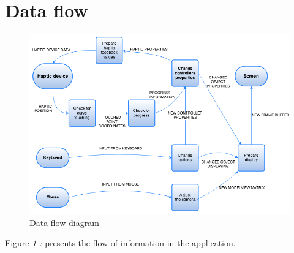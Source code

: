 \section{Data flow}
\begin{figure}
\begin{center}
	\includegraphics[width=\textwidth]{Images/data_flow_diagram}
	\caption{Data flow diagram}
	\label{fig:flow}	
\end{center}
\end{figure}
Figure \emph{\ref{fig:flow} : } presents the flow of information in the application. 


